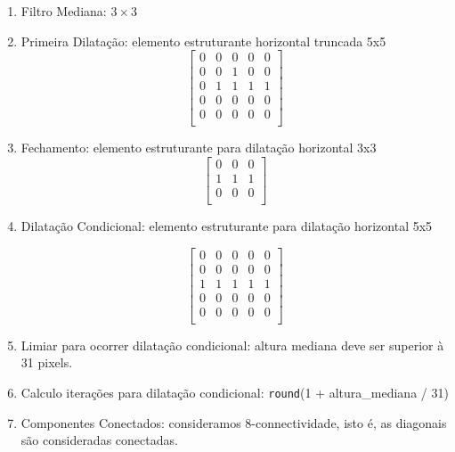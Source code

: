 \documentclass[english, 
               brazil, 
               bsc] %
               {dcomp-abntex2}
\begin{document}
\begin{enumerate}
  \item Filtro Mediana: $3 \times 3$
  \item Primeira Dilatação: elemento estruturante horizontal truncada 5x5
\[
\begin{bmatrix}
0 & 0 & 0 & 0 & 0 \\
0 & 0 & 1 & 0 & 0 \\
0 & 1 & 1 & 1 & 1 \\
0 & 0 & 0 & 0 & 0 \\
0 & 0 & 0 & 0 & 0 \\
\end{bmatrix}
\]
  \item Fechamento: elemento estruturante para dilatação horizontal 3x3
\[
\begin{bmatrix}
0 & 0 & 0 \\
1 & 1 & 1 \\
0 & 0 & 0 \\
\end{bmatrix}
\]

  \item Dilatação Condicional: elemento estruturante para dilatação horizontal 5x5

\[
\begin{bmatrix}
0 & 0 & 0 & 0 & 0 \\
0 & 0 & 0 & 0 & 0 \\
1 & 1 & 1 & 1 & 1 \\
0 & 0 & 0 & 0 & 0 \\
0 & 0 & 0 & 0 & 0 \\
\end{bmatrix}
\]
       
\item Limiar para ocorrer dilatação condicional: altura mediana deve ser superior à 31 pixels.

\item Calculo iterações para dilatação condicional: \texttt{round}(1 + altura\_mediana / 31)

\item Componentes Conectados: consideramos 8-connectividade, isto é, as diagonais são consideradas conectadas.

\end{enumerate}


\end{document}
